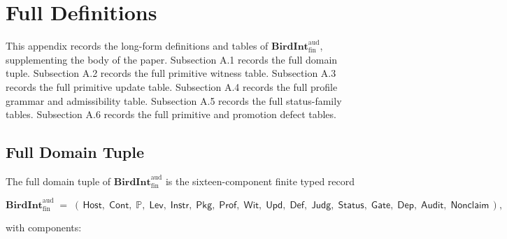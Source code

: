 \documentclass[11pt]{article}
\theoremstyle{definition}
\begin{document}
\appendix
\section{Full Definitions}

This appendix records the long-form definitions and tables of \(\mathbf{BirdInt}^{\mathrm{aud}}_{\mathrm{fin}}\), supplementing the body of the paper. Subsection A.1 records the full domain tuple. Subsection A.2 records the full primitive witness table. Subsection A.3 records the full primitive update table. Subsection A.4 records the full profile grammar and admissibility table. Subsection A.5 records the full status-family tables. Subsection A.6 records the full primitive and promotion defect tables.

\subsection{Full Domain Tuple}

The full domain tuple of \(\mathbf{BirdInt}^{\mathrm{aud}}_{\mathrm{fin}}\) is the sixteen-component finite typed record

\[
\mathbf{BirdInt}^{\mathrm{aud}}_{\mathrm{fin}}\;=\;(\,\mathsf{Host},\;\mathsf{Cont},\;\mathbb P,\;\mathsf{Lev},\;\mathsf{Instr},\;\mathsf{Pkg},\;\mathsf{Prof},\;\mathsf{Wit},\;\mathsf{Upd},\;\mathsf{Def},\;\mathsf{Judg},\;\mathsf{Status},\;\mathsf{Gate},\;\mathsf{Dep},\;\mathsf{Audit},\;\mathsf{Nonclaim}\,),
\]

with components:
\end{document}
